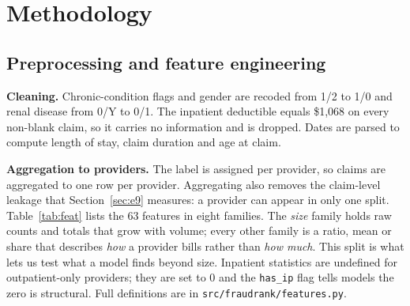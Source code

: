 \documentclass[11pt,a4paper]{article}
\begin{document}
\section{Methodology}

\subsection{Preprocessing and feature engineering}

\textbf{Cleaning.} Chronic-condition flags and gender are recoded from 1/2 to 1/0 and renal disease from 0/Y to 0/1. The inpatient deductible equals \$1,068 on every non-blank claim, so it carries no information and is dropped. Dates are parsed to compute length of stay, claim duration and age at claim.

\textbf{Aggregation to providers.} The label is assigned per provider, so claims are aggregated to one row per provider. Aggregating also removes the claim-level leakage that Section~\ref{sec:e9} measures: a provider can appear in only one split. Table~\ref{tab:feat} lists the 63 features in eight families. The \emph{size} family holds raw counts and totals that grow with volume; every other family is a ratio, mean or share that describes \emph{how} a provider bills rather than \emph{how much}. This split is what lets us test what a model finds beyond size. Inpatient statistics are undefined for outpatient-only providers; they are set to 0 and the \texttt{has\_ip} flag tells models the zero is structural. Full definitions are in \texttt{src/fraudrank/features.py}.
\end{document}
